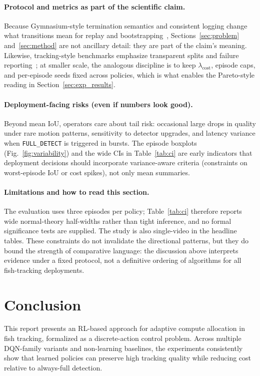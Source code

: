 \documentclass[letterpaper]{article}
\begin{document}
\paragraph{Protocol and metrics as part of the scientific claim.}
Because Gymnasium-style termination semantics and consistent logging change what transitions mean for replay and bootstrapping~\cite{gymapi,gymstep}, Sections~\ref{sec:problem} and~\ref{sec:method} are not ancillary detail: they are part of the claim's meaning. Likewise, tracking-style benchmarks emphasize transparent splits and failure reporting~\cite{lealtaixe2015mot}; at smaller scale, the analogous discipline is to keep $\lambda_{\mathrm{cost}}$, episode caps, and per-episode seeds fixed across policies, which is what enables the Pareto-style reading in Section~\ref{sec:exp_results}.

\paragraph{Deployment-facing risks (even if numbers look good).}
Beyond mean IoU, operators care about tail risk: occasional large drops in quality under rare motion patterns, sensitivity to detector upgrades, and latency variance when \texttt{FULL\_DETECT} is triggered in bursts. The episode boxplots (Fig.~\ref{fig:variability}) and the wide CIs in Table~\ref{tab:ci} are early indicators that deployment decisions should incorporate variance-aware criteria (constraints on worst-episode IoU or cost spikes), not only mean summaries.

\paragraph{Limitations and how to read this section.}
The evaluation uses three episodes per policy; Table~\ref{tab:ci} therefore reports wide normal-theory half-widths rather than tight inference, and no formal significance tests are supplied. The study is also single-video in the headline tables. These constraints do not invalidate the directional patterns, but they do bound the strength of comparative language: the discussion above interprets evidence under a fixed protocol, not a definitive ordering of algorithms for all fish-tracking deployments.

\section{Conclusion}
This report presents an RL-based approach for adaptive compute allocation in fish tracking, formalized as a discrete-action control problem. Across multiple DQN-family variants and non-learning baselines, the experiments consistently show that learned policies can preserve high tracking quality while reducing cost relative to always-full detection.
\end{document}
